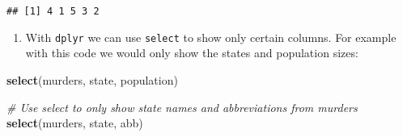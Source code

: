 \documentclass[]{article}
\newenvironment{Shaded}{\begin{snugshade}}{\end{snugshade}}
\newcommand{\CommentTok}[1]{\textcolor[rgb]{0.56,0.35,0.01}{\textit{#1}}}
\newcommand{\DataTypeTok}[1]{\textcolor[rgb]{0.13,0.29,0.53}{#1}}
\newcommand{\DecValTok}[1]{\textcolor[rgb]{0.00,0.00,0.81}{#1}}
\newcommand{\KeywordTok}[1]{\textcolor[rgb]{0.13,0.29,0.53}{\textbf{#1}}}
\newcommand{\NormalTok}[1]{#1}
\newcommand{\OperatorTok}[1]{\textcolor[rgb]{0.81,0.36,0.00}{\textbf{#1}}}
\newcommand{\StringTok}[1]{\textcolor[rgb]{0.31,0.60,0.02}{#1}}
\providecommand{\tightlist}{%
  \setlength{\itemsep}{0pt}\setlength{\parskip}{0pt}}
\begin{document}
\begin{verbatim}
## [1] 4 1 5 3 2
\end{verbatim}

\begin{Shaded}
\end{Shaded}

\begin{enumerate}
\def\labelenumi{\arabic{enumi}.}
\setcounter{enumi}{2}
\tightlist
\item
  With \texttt{dplyr} we can use \texttt{select} to show only certain
  columns. For example with this code we would only show the states and
  population sizes:
\end{enumerate}

\begin{Shaded}
\begin{Highlighting}[]
\KeywordTok{select}\NormalTok{(murders, state, population)}
\end{Highlighting}
\end{Shaded}

\begin{Shaded}
\begin{Highlighting}[]
\CommentTok{# Use select to only show state names and abbreviations from murders}
\KeywordTok{select}\NormalTok{(murders, state, abb)}
\end{Highlighting}
\end{Shaded}
\end{document}
